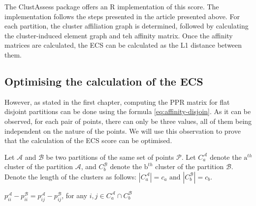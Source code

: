 The ClustAssess package offers an R implementation of this score. The implementation follows the steps presented in the article presented above. For each partition, the cluster affiliation graph is determined, followed by calculating the cluster-induced element graph and teh affinity matrix. Once the affinity matrices are calculated, the ECS can be calculated as the L1 distance between them.

\subsection{Optimising the calculation of the ECS}
However, as stated in the first chapter, computing the PPR matrix for flat disjoint partitions can be done using the formula \ref{eq:affinity-disjoin}. As it can be observed, for each pair of points, there can only be three values, all of them being independent on the nature of the points. We will use this observation to prove that the calculation of the ECS score can be optimised.



Let $\mathcal{A}$ and $\mathcal{B}$ be two partitions of the same set of points $\mathcal{P}$. Let $C_a^\mathcal{A}$ denote the $\text{a}^{th}$ cluster of the partition $\mathcal{A}$, and $C_b^\mathcal{B}$ denote the $\text{b}^{th}$ cluster of the partition $\mathcal{B}$. Denote the length of the clusters as follows: $|C_a^{\mathcal{A}}| = c_a \text{ and } |C_b^{\mathcal{B}}| = c_b$.

\begin{remark} \label{remark:pii}
    $p_{ii}^\mathcal{A} - p_{ii}^\mathcal{B} = p_{ij}^\mathcal{A} - p_{ij}^\mathcal{B}$, for any $i, j \in C_a^\mathcal{A} \cap C_b^\mathcal{B}$
\end{remark}

